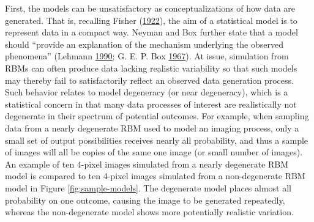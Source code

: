 \documentclass[]{article}
\theoremstyle{definition}
\begin{document}
First, the models can be unsatisfactory as conceptualizations of how
data are generated. That is, recalling Fisher
(\protect\hyperlink{ref-fisher1922mathematical}{1922}), the aim of a
statistical model is to represent data in a compact way. Neyman and Box
further state that a model should ``provide an explanation of the
mechanism underlying the observed phenomena'' (Lehmann
\protect\hyperlink{ref-lehmann1990model}{1990}; G. E. P. Box
\protect\hyperlink{ref-box1967discrimination}{1967}). At issue,
simulation from RBMs can often produce data lacking realistic
variability so that such models may thereby fail to satisfactorily
reflect an observed data generation process. Such behavior relates to
model degeneracy (or near degeneracy), which is a statistical concern in
that many data processes of interest are realistically not degenerate in
their spectrum of potential outcomes. For example, when sampling data
from a nearly degenerate RBM used to model an imaging process, only a
small set of output possibilities receives nearly all probability, and
thus a sample of images will all be copies of the same one image (or
small number of images). An example of ten 4-pixel images simulated from
a nearly degenerate RBM model is compared to ten 4-pixel images
simulated from a non-degenerate RBM model in Figure
\ref{fig:sample-models}. The degenerate model places almost all
probability on one outcome, causing the image to be generated
repeatedly, whereas the non-degenerate model shows more potentially
realistic variation.
\end{document}
